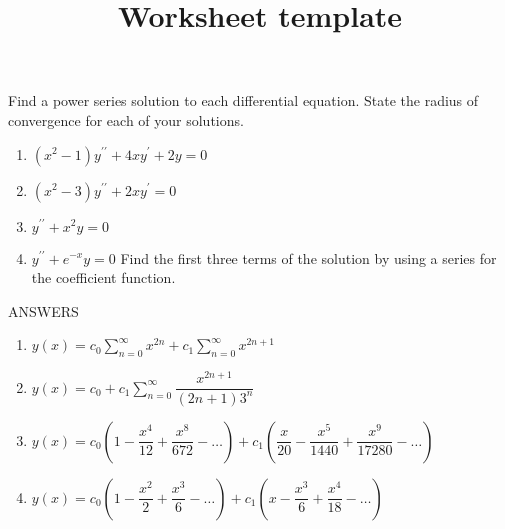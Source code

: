 \documentclass[12pt]{article}
\title{Worksheet template}
\begin{document}
\bigskip
\bigskip

Find a power series solution to each differential equation.  State the radius of convergence for each of your solutions.
\begin{enumerate}

\item
$(x^2 - 1)y^{\prime \prime} + 4xy^{\prime} + 2y = 0$

\item
$(x^2 - 3)y^{\prime \prime} + 2xy^{\prime} = 0$

\item
$y^{\prime \prime} + x^2 y = 0$

\item
$y^{\prime \prime} + e^{-x} y = 0$
\smallskip \newline{}
Find the first three terms of the solution by using a series for the coefficient function.

\end{enumerate}

\bigskip

\newpage

ANSWERS

\begin{enumerate}
	\item $y(x) = c_0 \displaystyle \sum_{n=0}^{\infty} x^{2n} +
    	c_1 \displaystyle \sum_{n=0}^{\infty} x^{2n + 1} $
	\item $y(x) = c_0 +	c_1 \displaystyle \sum_{n=0}^{\infty} \dfrac{x^{2n + 1}}{(2n+1)3^n} $
	\item $y(x) = c_0 \left( 1 - \dfrac{x^4}{12} + \dfrac{x^8}{672} - \ldots \right) +
    	c_1 \left( \dfrac{x}{20} - \dfrac{x^5}{1440} + \dfrac{x^9}{17280} - \ldots \right) $
	\item $y(x) = c_0 \left( 1 - \dfrac{x^2}{2} + \dfrac{x^3}{6} - \ldots \right) +
    	c_1 \left( x - \dfrac{x^3}{6} + \dfrac{x^4}{18} - \ldots \right) $
\end{enumerate}
\end{document}
